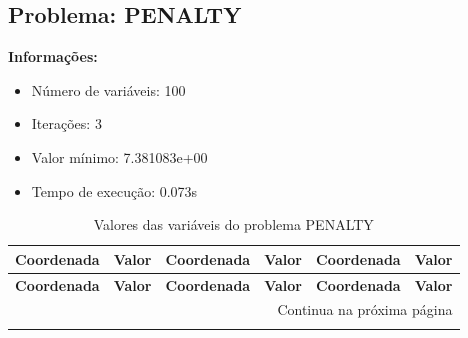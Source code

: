 \documentclass[12pt]{article}
\begin{document}
\newpage            
\subsection{Problema: PENALTY}

\textbf{Informações:}
\begin{itemize}
\item Número de variáveis: 100
\item Iterações: 3
\item Valor mínimo: 7.381083e+00
\item Tempo de execução: 0.073s
\end{itemize}

\small
\begin{longtable}{@{}cc|cc|cc@{}}
\caption{Valores das variáveis do problema PENALTY} \\
\toprule
\textbf{Coordenada} & \textbf{Valor} & \textbf{Coordenada} & \textbf{Valor} & \textbf{Coordenada} & \textbf{Valor} \\
\midrule
\endfirsthead

\toprule
\textbf{Coordenada} & \textbf{Valor} & \textbf{Coordenada} & \textbf{Valor} & \textbf{Coordenada} & \textbf{Valor} \\
\midrule
\endhead

\midrule \multicolumn{6}{r}{{Continua na próxima página}} \\ \midrule
\endfoot


\end{longtable}
\end{document}
